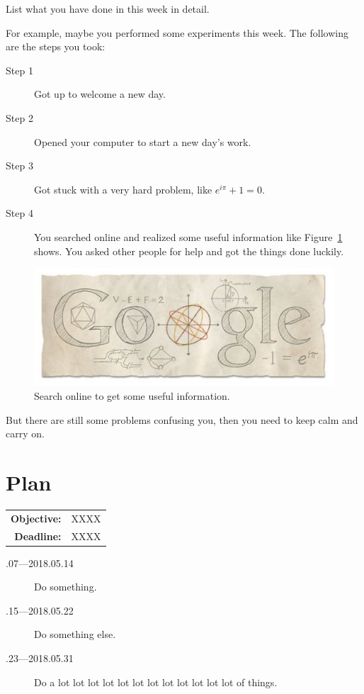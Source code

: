 \documentclass[a4paper]{article}
\begin{document}
List what you have done in this week in detail.

For example, maybe you performed some experiments this week. The following are the steps you took:

\begin{description}
\item [Step 1]
Got up to welcome a new day.
\item[Step 2]
Opened your computer to start a new day's work.
\item[Step 3]
Got stuck with a very hard problem, like $e^{i \pi} + 1 = 0$.
\item[Step 4]
You searched online and realized some useful information like Figure~\ref{fig:google} shows. You asked other people for help and got the things done luckily.
\end{description}

\begin{figure}[hb]
    \centering
    \includegraphics{figures/google}
    \caption{Search online to get some useful information.}
    \label{fig:google}
\end{figure}

But there are still some problems confusing you, then you need to keep calm and carry on.

\section{Plan}

\begin{tabular}{rl}
	\textbf{Objective:} & XXXX \\
    \textbf{Deadline:} & XXXX 
\end{tabular}

\begin{description}
    \item[.07---2018.05.14] Do something.
    \item[.15---2018.05.22] Do something else.
    \item[.23---2018.05.31] Do a lot lot lot lot lot lot lot lot lot lot lot lot of things.
\end{description}



\end{document}
